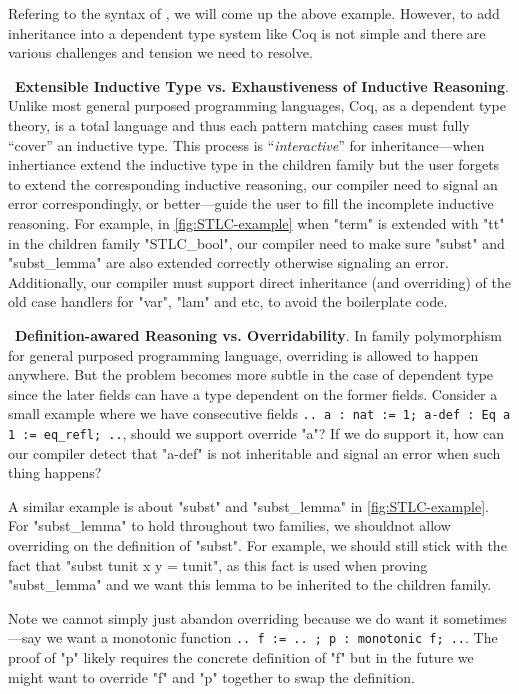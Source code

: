 Refering to the syntax of \citet{zm2017}, we will come up the above
example. However, to add inheritance into a dependent type system like
Coq is not simple and there are various challenges and tension we need
to resolve. 


~\textbf{Extensible Inductive Type vs. Exhaustiveness of Inductive Reasoning}.
Unlike most general purposed programming languages, Coq, as a dependent
type theory, is a total language and thus each pattern matching cases
must fully ``cover'' an inductive type. This process is
``\textit{interactive}'' for inheritance---when inhertiance extend the
inductive type in the children family but the user forgets to extend the
corresponding inductive reasoning, our compiler need to signal an error
correspondingly, or better---guide the user to fill the incomplete
inductive reasoning. For example, in \cref{fig:STLC-example} when "term"
is extended with "tt" in the children family "STLC_bool", our compiler
need to make sure "subst" and "subst_lemma" are also extended correctly
otherwise signaling an error.
Additionally, our compiler must support direct inheritance (and
overriding) of the old case handlers for "var", "lam" and etc, to avoid
the boilerplate code. 


~\textbf{Definition-awared Reasoning vs. Overridability}.
In family polymorphism for general purposed programming language,
overriding is allowed to happen anywhere. But the problem becomes more
subtle in the case of dependent type since the later fields can have a
type dependent on the former fields.  Consider a small example where we
have consecutive fields \texttt{{.. a : nat := 1; a-def : Eq a
1 := eq_refl; ..}}, should we support override "a"? If we do support it,
how can our compiler detect that "a-def" is not inheritable and signal
an error when such thing happens? 

A similar example is about "subst" and "subst_lemma" in
\cref{fig:STLC-example}. For "subst_lemma" to hold throughout two
families, we shouldnot allow overriding on the definition of "subst".
For example, we should still stick with the fact that "subst tunit x y =
tunit", as this fact is used when proving "subst_lemma" and we want this
lemma to be inherited to the children family.

Note we cannot simply just abandon overriding because we do want it sometimes---say we want a monotonic function \texttt{{.. f := .. ; p : monotonic f; ..}}. The proof of "p" likely requires the concrete definition of "f" but in the future we might want to override "f" and "p" together to swap the definition.


